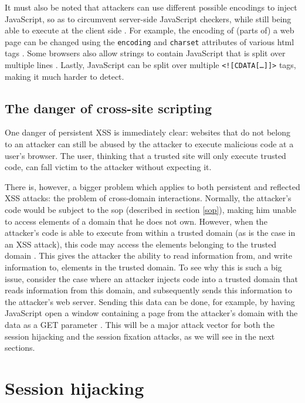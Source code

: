 It must also be noted that attackers can use different possible encodings to inject JavaScript, so as to circumvent server-side JavaScript checkers, while still being able to execute at the client side \cite{Jim2007}. For example, the encoding of (parts of) a web page can be changed using the \texttt{encoding} and \texttt{charset} attributes of various \gls{html} tags \cite{Ishida2010}. Some browsers also allow strings to contain JavaScript that is split over multiple lines \cite{Jim2007}. Lastly, JavaScript can be split over multiple  \texttt{<![CDATA[\dots]]>} tags, making it much harder to detect.

\subsection{The danger of cross-site scripting}\label{xss-problem}

One danger of persistent XSS is immediately clear: websites that do not belong to an attacker can still be abused by the attacker to execute malicious code at a user's browser. The user, thinking that a trusted site will only execute trusted code, can fall victim to the attacker without expecting it.

There is, however, a bigger problem which applies to both persistent and reflected XSS attacks: the problem of cross-domain interactions. Normally, the attacker's code would be subject to the \gls{sop} (described in section \ref{sop}), making him unable to access elements of a domain that he does not own. However, when the attacker's code is able to execute from within a trusted domain (as is the case in an XSS attack), this code may access the elements belonging to the trusted domain \cite{Klein2002}. This gives the attacker the ability to read information from, and write information to, elements in the trusted domain. To see why this is such a big issue, consider the case where an attacker injects code into a trusted domain that reads information from this domain, and subsequently sends this information to the attacker's web server. Sending this data can be done, for example, by having JavaScript open a window containing a page from the attacker's domain with the data as a GET parameter \cite{Klein2002}. This will be a major attack vector for both the session hijacking and the session fixation attacks, as we will see in the next sections.

\section{Session hijacking}\label{hijacking}

